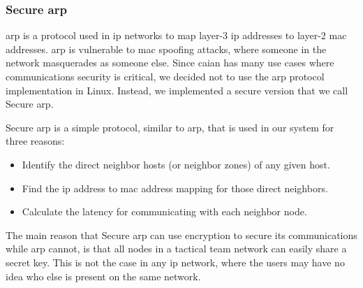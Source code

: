 \subsubsection{Secure \acrshort{arp}}
\qquad \acrfull{arp} is a protocol used in \acrshort{ip} networks to map layer-3 \acrshort{ip} addresses to layer-2 \acrshort{mac} addresses. \acrshort{arp} is vulnerable to \acrshort{mac} spoofing attacks, where someone in the network masquerades as someone else. Since \acrshort{caian} has many use cases where communications security is critical, we decided not to use the \acrshort{arp} protocol implementation in Linux. Instead, we implemented a secure version that we call Secure \acrshort{arp}.

Secure \acrshort{arp} is a simple protocol, similar to \acrshort{arp}, that is used in our system for three reasons:
\begin{itemize}[itemsep=1pt, topsep=5pt]
    \item Identify the direct neighbor hosts (or neighbor zones) of any given host.
    \item Find the \acrshort{ip} address to \acrshort{mac} address mapping for those direct neighbors.
    \item Calculate the latency for communicating with each neighbor node.
\end{itemize}
The main reason that Secure \acrshort{arp} can use encryption to secure its communications while \acrshort{arp} cannot, is that all nodes in a tactical team network can easily share a secret key. This is not the case in any \acrshort{ip} network, where the users may have no idea who else is present on the same network.

